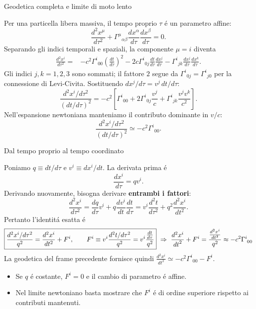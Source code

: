 \begin{frame}[t]{Geodetica completa e limite di moto lento}
\small\raggedright
Per una particella libera massiva, il tempo proprio $\tau$ \'e un parametro affine:
\[
\frac{d^2x^\mu}{d\tau^2}
+\Gamma^\mu{}_{\alpha\beta}
\frac{dx^\alpha}{d\tau}\frac{dx^\beta}{d\tau}=0.
\]
Separando gli indici temporali e spaziali, la componente $\mu=i$ diventa
\[
\begin{aligned}
\frac{d^2x^i}{d\tau^2}={}&-c^2\Gamma^i{}_{00}
\left(\frac{dt}{d\tau}\right)^2
-2c\Gamma^i{}_{0j}\frac{dt}{d\tau}\frac{dx^j}{d\tau}
-\Gamma^i{}_{jk}\frac{dx^j}{d\tau}\frac{dx^k}{d\tau}.
\end{aligned}
\]
Gli indici $j,k=1,2,3$ sono sommati; il fattore $2$ segue da
$\Gamma^i{}_{0j}=\Gamma^i{}_{j0}$ per la connessione di Levi-Civita.
Sostituendo $dx^j/d\tau=v^j\,dt/d\tau$:
\[
\frac{d^2x^i/d\tau^2}{(dt/d\tau)^2}
=-c^2\left[
\Gamma^i{}_{00}
+2\Gamma^i{}_{0j}\frac{v^j}{c}
+\Gamma^i{}_{jk}\frac{v^jv^k}{c^2}\right].
\]
Nell'espansione newtoniana manteniamo il contributo dominante in $v/c$:
\[
\boxed{\frac{d^2x^i/d\tau^2}{(dt/d\tau)^2}
\simeq-c^2\Gamma^i{}_{00}.}
\]
\end{frame}

\begin{frame}[t]{Dal tempo proprio al tempo coordinato}
\small\raggedright
Poniamo $q\equiv dt/d\tau$ e $v^i\equiv dx^i/dt$. La derivata prima \'e
\[
\frac{dx^i}{d\tau}=qv^i.
\]
Derivando nuovamente, bisogna derivare \textbf{entrambi i fattori}:
\[
\frac{d^2x^i}{d\tau^2}
=\frac{dq}{d\tau}v^i
+q\frac{dv^i}{dt}\frac{dt}{d\tau}
=v^i\frac{d^2t}{d\tau^2}+q^2\frac{d^2x^i}{dt^2}.
\]
Pertanto l'identit\'a esatta \'e
\[
\boxed{
\frac{d^2x^i/d\tau^2}{q^2}
=\frac{d^2x^i}{dt^2}+F^i,
\qquad
F^i\equiv v^i\frac{d^2t/d\tau^2}{q^2}=v^i \frac{\TDy{\tau}{t}}{q^2}}\ \Rightarrow\ \TtwoDy{t}{x\indices{^i}}+F\indices{^i}=\frac{\TtwoDy{t}{x\indices{^i}}}{q^2}\approx-c^2\Gamma\indices{^i_{00}}
\]
La geodetica del frame precedente fornisce quindi $\frac{d^2x^i}{dt^2}\simeq-c^2\Gamma^i{}_{00}-F^i$.
\begin{itemize}
  \item Se $q$ \'e costante, $F^i=0$ e il cambio di parametro \'e affine.
  \item Nel limite newtoniano basta mostrare che $F^i$ \'e di ordine
  superiore rispetto ai contributi mantenuti.
\end{itemize}
\end{frame}

